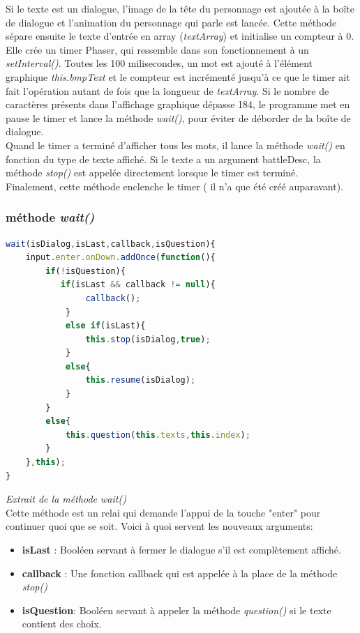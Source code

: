 \documentclass[11pt]{article}
\begin{document}
Si le texte est un dialogue, l'image de la tête du personnage est ajoutée à la boîte de dialogue et l'animation du personnage qui parle est lancée.
Cette méthode sépare ensuite le texte d'entrée en array (\textit{textArray}) et initialise un compteur à 0. Elle crée un timer Phaser, qui ressemble dans son fonctionnement à un \textit{setInterval()}. Toutes les 100 milisecondes, un mot est ajouté à l'élément graphique \textit{this.bmpText} et le compteur est incrémenté jusqu'à ce que le timer ait fait l'opération autant de fois que la longueur de \textit{textArray}. Si le nombre de caractères présents dans l'affichage graphique dépasse 184, le programme met en pause le timer et lance la méthode \textit{wait()}, pour éviter de déborder de la boîte de dialogue.\\

 Quand le timer a terminé d'afficher tous les mots, il lance la méthode \textit{wait()} en fonction du type de texte affiché. Si le texte a un argument battleDesc, la méthode \textit{stop()} est appelée directement lorsque le timer est terminé.\\
 
Finalement, cette méthode enclenche le timer ( il n'a que été créé auparavant).
 
\subsubsection{méthode \textit{wait()}}
\begin{lstlisting}[language=JavaScript]
wait(isDialog,isLast,callback,isQuestion){ 
    input.enter.onDown.addOnce(function(){ 
    	if(!isQuestion){
     	   if(isLast && callback != null){
       	     	callback();
       	 	}
        	else if(isLast){
            	this.stop(isDialog,true);
        	}
        	else{
            	this.resume(isDialog);
        	}
    	}
    	else{
        	this.question(this.texts,this.index);
    	}
	},this);
}
\end{lstlisting} 
\textit{Extrait de la méthode wait()}\\ Cette méthode est un relai qui demande l'appui de la touche "enter" pour continuer quoi que se soit. Voici à quoi servent les nouveaux arguments: 
\begin{itemize}
\item \textbf{isLast} : Booléen servant à fermer le dialogue s'il est complètement affiché.
\item \textbf{callback} : Une fonction callback qui est appelée à la place de la méthode \textit{stop()}
\item \textbf{isQuestion}: Booléen servant à appeler la méthode \textit{question()} si le texte contient des choix.
\end{itemize}
\end{document}
